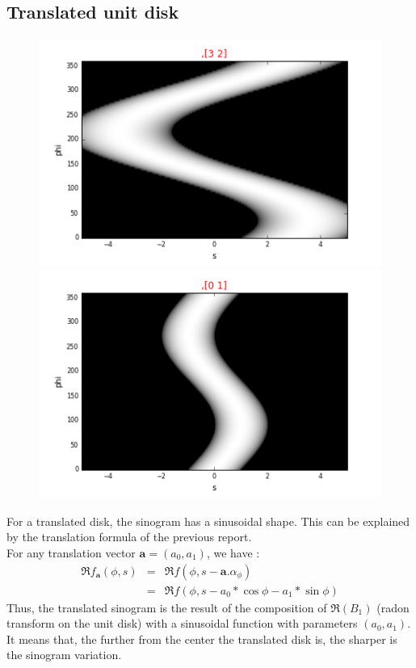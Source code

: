 \documentclass[a4,12pt]{article}
\begin{document}
\subsection{Translated unit disk}
\begin{figure}[h!]
   \begin{minipage}[c]{.46\linewidth}
      \includegraphics[scale=0.5]{../images/sinograms/translatedUnitDisk.png} 
   \end{minipage} \hfill
   \begin{minipage}[c]{.46\linewidth}
      \includegraphics[scale=0.5]{../images/sinograms/translatedUnitDiskCloseCenter1.png} 
   \end{minipage}
\end{figure}
For a translated disk, the sinogram has a sinusoidal shape. This can be explained by the translation formula of the previous report. \\
For any translation vector $\textbf{a}=(a_{0},a_{1})$, we have :
\begin{eqnarray*}
\Re f_{\textbf{a}}(\phi,s) &=& \Re f(\phi,s-\textbf{a}.\alpha_{\phi}) \\
                 &=& \Re f(\phi,s-a_{0}*\cos\phi - a_{1}*\sin\phi)
\end{eqnarray*}
Thus, the translated sinogram is the result of the composition of $\Re(B_{1})$ (radon transform on the unit disk) with a sinusoidal function with parameters $(a_0,a_1)$. It means that, the  further from the center the translated disk is, the sharper is the sinogram variation. 
\end{document}
